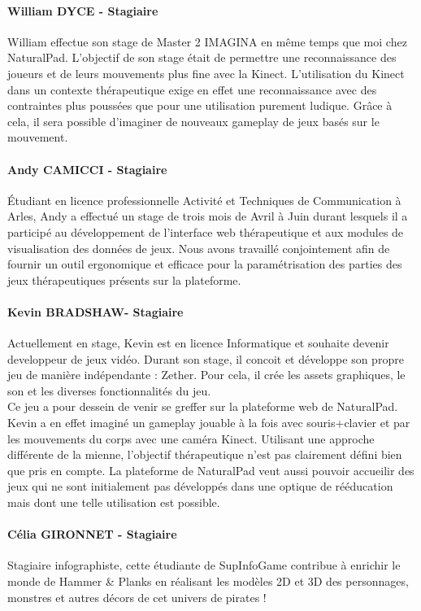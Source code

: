 		\paragraph{William DYCE - Stagiaire\\}
William effectue son stage de Master 2 IMAGINA en même temps que moi chez NaturalPad. L'objectif de son stage était de permettre une reconnaissance des joueurs et de leurs mouvements plus fine avec la Kinect. L'utilisation du Kinect dans un contexte thérapeutique exige en effet une reconnaissance avec des contraintes plus poussées que pour une utilisation purement ludique. Grâce à cela, il sera possible d’imaginer de nouveaux gameplay de jeux basés sur le mouvement.

		\paragraph{Andy CAMICCI - Stagiaire\\}
Étudiant en licence professionnelle Activité et Techniques de Communication à Arles, Andy a effectué un stage de trois mois de Avril à Juin durant lesquels il a participé au développement de l'interface web thérapeutique et aux modules de visualisation des données de jeux. Nous avons travaillé conjointement afin de fournir un outil ergonomique et efficace pour la paramétrisation des parties des jeux thérapeutiques présents sur la plateforme.
		
		\paragraph{Kevin BRADSHAW- Stagiaire}
Actuellement en stage, Kevin est en licence Informatique et souhaite devenir developpeur de jeux vidéo. Durant son stage, il concoit et développe son propre jeu de manière indépendante : Zether. Pour cela, il crée les assets graphiques, le son et les diverses fonctionnalités du jeu. \\
Ce jeu a pour dessein de venir se greffer sur la plateforme web de NaturalPad. Kevin a en effet imaginé un gameplay jouable à la fois avec souris+clavier et par les mouvements du corps avec une caméra Kinect. Utilisant une approche différente de la mienne, l'objectif thérapeutique n'est pas clairement défini bien que pris en compte. La plateforme de NaturalPad veut aussi pouvoir accueilir des jeux qui ne sont initialement pas développés dans une optique de rééducation mais dont une telle utilisation est possible.
		
		\paragraph{Célia GIRONNET - Stagiaire\\}
Stagiaire infographiste, cette étudiante de SupInfoGame contribue à enrichir le monde de Hammer \& Planks en réalisant les modèles 2D et 3D des personnages, monstres et autres décors de cet univers de pirates !

